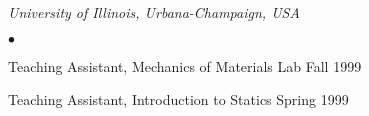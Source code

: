 \documentclass[margin,line]{res}
\newenvironment{list2}{
  \begin{list}{$\bullet$}{%
      \setlength{\itemsep}{0in}
      \setlength{\parsep}{0in} \setlength{\parskip}{0in}
      \setlength{\topsep}{0in} \setlength{\partopsep}{0in}
      \setlength{\leftmargin}{0.2in}}}{\end{list}}
\begin{document}
\begin{resume}
\emph{University of Illinois, Urbana-Champaign, USA}
\begin{list2}
\item Teaching Assistant, Mechanics of Materials Lab \hfill Fall 1999
\item Teaching Assistant, Introduction to Statics \hfill Spring 1999
\end{list2}






\end{resume}
\end{document}
